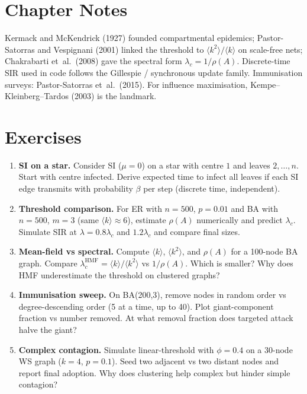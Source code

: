 \section{Chapter Notes}
Kermack and McKendrick (1927) founded compartmental epidemics; Pastor-Satorras and Vespignani (2001) linked the threshold to $\langle k^2\rangle/\langle k\rangle$ on scale-free nets; Chakrabarti et~al.\ (2008) gave the spectral form $\lambda_c=1/\rho(A)$. Discrete-time SIR used in code follows the Gillespie / synchronous update family. Immunisation surveys: Pastor-Satorras et~al.\ (2015). For influence maximisation, Kempe--Kleinberg--Tardos (2003) is the landmark.

\section{Exercises}
\label{sec:ch06-exercises}
\begin{enumerate}[label=E6.\arabic*, leftmargin=*, itemsep=0.8em]
    \item \textbf{SI on a star.} Consider SI ($\mu=0$) on a star with centre $1$ and leaves $2,\dots,n$. Start with centre infected. Derive expected time to infect all leaves if each SI edge transmits with probability $\beta$ per step (discrete time, independent).
    \item \textbf{Threshold comparison.} For ER with $n=500$, $p=0.01$ and BA with $n=500$, $m=3$ (same $\langle k\rangle\approx6$), estimate $\rho(A)$ numerically and predict $\lambda_c$. Simulate SIR at $\lambda=0.8\lambda_c$ and $1.2\lambda_c$ and compare final sizes.
    \item \textbf{Mean-field vs spectral.} Compute $\langle k\rangle$, $\langle k^2\rangle$, and $\rho(A)$ for a 100-node BA graph. Compare $\lambda_c^{\text{HMF}}=\langle k\rangle/\langle k^2\rangle$ vs $1/\rho(A)$. Which is smaller? Why does HMF underestimate the threshold on clustered graphs?
    \item \textbf{Immunisation sweep.} On BA(200,3), remove nodes in random order vs degree-descending order (5 at a time, up to 40). Plot giant-component fraction vs number removed. At what removal fraction does targeted attack halve the giant?
    \item \textbf{Complex contagion.} Simulate linear-threshold with $\phi=0.4$ on a 30-node WS graph ($k=4$, $p=0.1$). Seed two adjacent vs two distant nodes and report final adoption. Why does clustering help complex but hinder simple contagion?
\end{enumerate}

